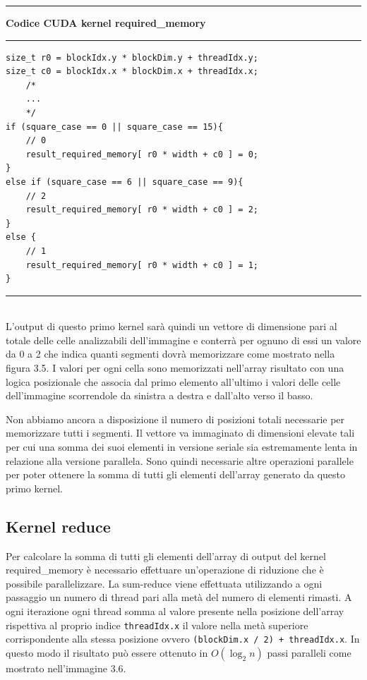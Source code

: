 \documentclass[12pt,a4paper]{report}
\begin{document}
\noindent\rule[0.5ex]{\linewidth}{2pt}
\small{\textbf{Codice CUDA kernel required\_memory}} \\
\noindent\rule[0.5ex]{\linewidth}{1pt}
\begin{lstlisting}
size_t r0 = blockIdx.y * blockDim.y + threadIdx.y;
size_t c0 = blockIdx.x * blockDim.x + threadIdx.x;
    /*
    ...
    */
if (square_case == 0 || square_case == 15){
    // 0
    result_required_memory[ r0 * width + c0 ] = 0;
}
else if (square_case == 6 || square_case == 9){
    // 2
    result_required_memory[ r0 * width + c0 ] = 2;
}
else {
    // 1
    result_required_memory[ r0 * width + c0 ] = 1;
}  
\end{lstlisting}
\noindent\rule[0.5ex]{\linewidth}{1pt} \\[10pt]
\newpage
L'output di questo primo kernel sarà quindi un vettore di dimensione pari al totale delle celle analizzabili dell'immagine e conterrà per ognuno di essi un valore da 0 a 2 che indica quanti segmenti dovrà memorizzare come mostrato nella figura 3.5. I valori per ogni cella sono memorizzati nell'array risultato con una logica posizionale che associa dal primo elemento all'ultimo i valori delle celle dell'immagine scorrendole da sinistra a destra e dall'alto verso il basso.
\begin{figure}[H]
\centering
\begin{floatrow}[1]
\end{floatrow}
\end{figure} 
Non abbiamo ancora a disposizione il numero di posizioni totali necessarie per memorizzare tutti i segmenti. Il vettore va immaginato di dimensioni elevate tali per cui una somma dei suoi elementi in versione seriale sia estremamente lenta in relazione alla versione parallela. Sono quindi necessarie altre operazioni parallele per poter ottenere la somma di tutti gli elementi dell'array generato da questo primo kernel. \newpage

\subsection{Kernel reduce}
Per calcolare la somma di tutti gli elementi dell'array di output del kernel required\_memory è necessario effettuare un'operazione di riduzione che è possibile parallelizzare. \newline
La sum-reduce viene effettuata utilizzando a ogni passaggio un numero di thread pari alla metà del numero di elementi rimasti. A ogni iterazione ogni thread somma al valore presente nella posizione dell'array rispettiva al proprio indice \verb|threadIdx.x| il valore nella metà superiore corrispondente alla stessa posizione ovvero \verb|(blockDim.x / 2) + threadIdx.x|. \newline In questo modo il risultato può essere ottenuto in $O(\log_2 n)$ passi paralleli come mostrato nell'immagine 3.6.
\end{document}
